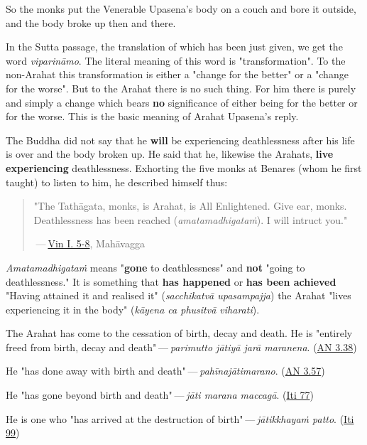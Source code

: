 So the monks put the Venerable Upasena's body on a couch and bore it outside, and the body broke up then and there.

In the Sutta passage, the translation of which has been just given, we get the word \emph{viparināmo}. The literal meaning of this word is "transformation". To the non-Arahat this transformation is either a "change for the better" or a "change for the worse". But to the Arahat there is no such thing. For him there is purely and simply a change which bears \textbf{no} significance of either being for the better or for the worse. This is the basic meaning of Arahat Upasena's reply.

The Buddha did not say that he \textbf{will} be experiencing deathlessness after his life is over and the body broken up. He said that he, likewise the Arahats, \textbf{live experiencing} deathlessness. Exhorting the five monks at Benares (whom he first taught) to listen to him, he described himself thus:

\begin{quote}
"The Tathāgata, monks, is Arahat, is All Enlightened. Give ear, monks. Deathlessness has been reached (\emph{amatamadhigataṁ}). I will intruct you."

 --- \href{https://suttacentral.net/pli-tv-kd1/en/brahmali}{Vin I. 5-8}, Mahāvagga
\end{quote}

\emph{Amatamadhigataṁ} means "\textbf{gone} to deathlessness" and \textbf{not} "going to deathlessness." It is something that \textbf{has happened} or \textbf{has been achieved} "Having attained it and realised it" (\emph{sacchikatvā upasampajja}) the Arahat "lives experiencing it in the body" (\emph{kāyena ca phusitvā viharati}).

The Arahat has come to the cessation of birth, decay and death. He is "entirely freed from birth, decay and death" --- \emph{parimutto jātiyā jarā maranena}. (\href{https://suttacentral.net/an3.38/en/bodhi}{AN 3.38})

He "has done away with birth and death" --- \emph{pahīnajātimarano}. (\href{https://suttacentral.net/an3.57/en/bodhi}{AN 3.57})

He "has gone beyond birth and death" --- \emph{jāti marana maccagā}. (\href{https://suttacentral.net/iti77/en/sujato}{Iti 77})

He is one who "has arrived at the destruction of birth" --- \emph{jātikkhayaṁ patto}. (\href{https://suttacentral.net/iti99/en/sujato}{Iti 99})

